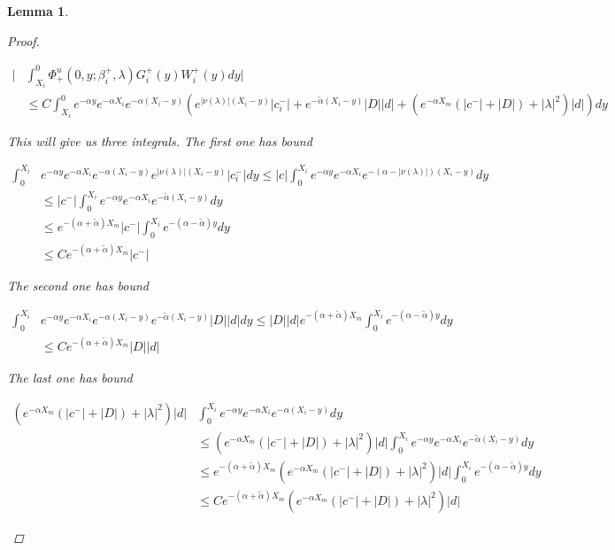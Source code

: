 \documentclass[12pt]{article}
\newtheorem{lemma}{Lemma}
\begin{document}
\begin{lemma}
\begin{proof}
\begin{enumerate}
\begin{align*}
\Big| &\int_{X_i}^0 \Phi^u_+(0, y; \beta_i^+, \lambda) G_i^+(y)W_i^+(y) dy \Big| \\
&\leq C \int_{X_i}^0 e^{-\alpha y} e^{-\alpha X_i} e^{-\alpha (X_i - y)} ( e^{|\nu(\lambda)|(X_i - y)} |c_i^-| + e^{-\tilde{\alpha}(X_i - y)}|D||d| + ( e^{-\alpha X_m}( |c^-| + |D| ) + |\lambda|^2) |d|) dy
\end{align*}

This will give us three integrals. The first one has bound

\begin{align*}
\int_0^{X_i} &e^{-\alpha y} e^{-\alpha X_i} e^{-\alpha (X_i - y)} e^{|\nu(\lambda)|(X_i - y)} |c_i^-| dy \leq |c| \int_0^{X_i} e^{-\alpha y} e^{-\alpha X_i} e^{-(\alpha - |\nu(\lambda)|) (X_i - y)} dy \\ 
&\leq |c^-| \int_0^{X_i} e^{-\alpha y} e^{-\alpha X_i} e^{-\tilde{\alpha}(X_i - y)} dy \\
&\leq e^{-(\alpha + \tilde{\alpha}) X_m} |c^-| \int_0^{X_i} e^{-(\alpha - \tilde{\alpha}) y} dy \\
&\leq C e^{-(\alpha + \tilde{\alpha}) X_m} |c^-|
\end{align*}

The second one has bound

\begin{align*}
\int_0^{X_i} &e^{-\alpha y} e^{-\alpha X_i} e^{-\alpha (X_i - y)} e^{-\tilde{\alpha}(X_i - y)}|D||d|  dy \leq |D| |d| e^{-(\alpha + \tilde{\alpha})X_m } \int_0^{X_i} e^{-(\alpha - \tilde{\alpha})y } dy \\
&\leq C e^{-(\alpha + \tilde{\alpha}) X_m } |D||d|
\end{align*}

The last one has bound

\begin{align*}
( e^{-\alpha X_m}( |c^-| + |D| ) + |\lambda|^2) |d| &\int_0^{X_i} e^{-\alpha y} e^{-\alpha X_i} e^{-\alpha (X_i - y)} dy \\
&\leq ( e^{-\alpha X_m}( |c^-| + |D| ) + |\lambda|^2) |d| \int_0^{X_i} e^{-\alpha y} e^{-\alpha X_i} e^{-\tilde{\alpha} (X_i - y)} dy \\
&\leq e^{-(\alpha + \tilde{\alpha})X_m } ( e^{-\alpha X_m}( |c^-| + |D| ) + |\lambda|^2) |d| \int_0^{X_i} e^{-(\alpha - \tilde{\alpha})y } dy \\
&\leq C e^{-(\alpha + \tilde{\alpha})X_m } ( e^{-\alpha X_m}( |c^-| + |D| ) + |\lambda|^2) |d|
\end{align*}


\end{enumerate}
\end{proof}
\end{lemma}
\end{document}
